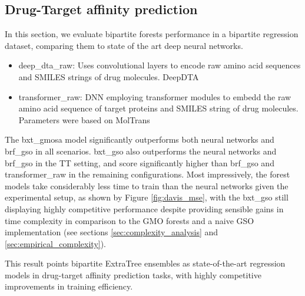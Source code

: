 


\subsection{Drug-Target affinity prediction}

In this section, we evaluate bipartite forests performance in a bipartite regression dataset, comparing them to state of the art deep neural networks.

\begin{itemize}
    \item deep\_dta\_raw: Uses convolutional layers to encode raw amino acid sequences and SMILES strings of drug molecules. DeepDTA \cite{Ozturk_2018}
    \item transformer\_raw: DNN employing transformer modules to embedd the raw amino acid sequence of target proteins and SMILES string of drug molecules. Parameters were based on MolTrans \cite{}
\end{itemize}

The bxt\_gmosa model \cite{Pliakos_2020} significantly outperforms both neural networks and brf\_gso in all scenarios. bxt\_gso also outperforms the neural networks and brf\_gso in the TT setting, and score significantly higher than brf\_gso and transformer\_raw in the remaining configurations. Most impressively, the forest models take considerably less time to train than the neural networks given the experimental setup, as shown by Figure \ref{fig:davis_mse}, with the bxt\_gso still displaying highly competitive performance despite providing sensible gains in time complexity in comparison to the GMO forests and a naive GSO implementation (see sections \ref{sec:complexity_analysis} and \ref{sec:empirical_complexity}).

This result points bipartite ExtraTree ensembles as state-of-the-art regression models in drug-target affinity prediction tasks, with highly competitive improvements in training efficiency.



